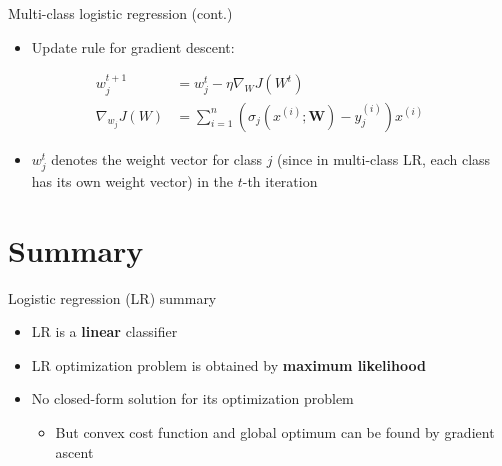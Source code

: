 \documentclass[serif, aspectratio=169]{beamer}
\begin{document}
\begin{frame}{Multi-class logistic regression (cont.)}
    \begin{itemize}
        \item Update rule for gradient descent:
        
    \end{itemize}
    \begin{align*}
            w_j^{t+1} &= w_j^t - \eta \nabla _W J(W^t) \\
            \nabla _{w_{j}} J(W) &= \sum_{i=1}^{n} (\sigma _j(x^{(i)}; \mathbf{W}) - y_j^{(i)})x^{(i)}
        \end{align*}
        
    \begin{itemize}
        \item $w_j^t$ denotes the weight vector for class $j$ (since in multi-class LR, each class has its own weight vector) in the $t$-th iteration
    \end{itemize}
\end{frame}


\section{Summary}

\begin{frame}{Logistic regression (LR) summary}
    \begin{itemize}
        \item LR is a \textbf{linear} classifier
        \item LR optimization problem is obtained by \textbf{maximum likelihood}
        \item No closed-form solution for its optimization problem
            \begin{itemize}
                \item But convex cost function and global optimum can be found by gradient ascent
            \end{itemize}
    \end{itemize}
\end{frame}


\end{document}
